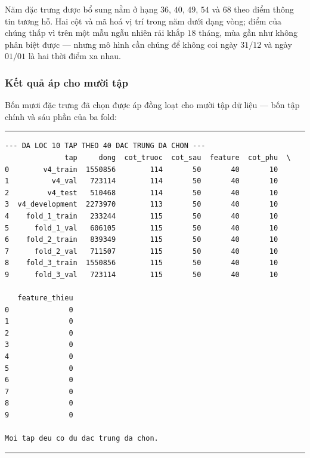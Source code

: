 \documentclass[12pt,a4paper]{article}
\DeclareRobustCommand{\tep}[1]{\texttt{\detokenize{#1}}}
\renewcommand{\baselinestretch}{1.35}
\begin{document}
Năm đặc trưng được bổ sung nằm ở hạng $36$, $40$, $49$, $54$ và $68$ theo điểm thông tin tương
hỗ. Hai cột \tep{doy_sin} và \tep{doy_cos} mã hoá vị trí trong năm dưới dạng vòng; điểm của
chúng thấp vì trên một mẫu ngẫu nhiên rải khắp $18$ tháng, mùa gần như không phân biệt được ---
nhưng mô hình cần chúng để không coi ngày $31/12$ và ngày $01/01$ là hai thời điểm xa nhau.

\subsubsection{Kết quả áp cho mười tập}

Bốn mươi đặc trưng đã chọn được áp đồng loạt cho mười tập dữ liệu --- bốn tập chính và sáu phần
của ba fold:

\begingroup
\par\vspace{6pt}\hrule\vspace{4pt}
\small\renewcommand{\baselinestretch}{1.0}\selectfont
\begin{verbatim}
--- DA LOC 10 TAP THEO 40 DAC TRUNG DA CHON ---
              tap     dong  cot_truoc  cot_sau  feature  cot_phu  \
0        v4_train  1550856        114       50       40       10   
1          v4_val   723114        114       50       40       10   
2         v4_test   510468        114       50       40       10   
3  v4_development  2273970        113       50       40       10   
4    fold_1_train   233244        115       50       40       10   
5      fold_1_val   606105        115       50       40       10   
6    fold_2_train   839349        115       50       40       10   
7      fold_2_val   711507        115       50       40       10   
8    fold_3_train  1550856        115       50       40       10   
9      fold_3_val   723114        115       50       40       10   

   feature_thieu  
0              0  
1              0  
2              0  
3              0  
4              0  
5              0  
6              0  
7              0  
8              0  
9              0  

Moi tap deu co du dac trung da chon.
\end{verbatim}
\vspace{2pt}\hrule\par\vspace{6pt}
\endgroup
\end{document}
